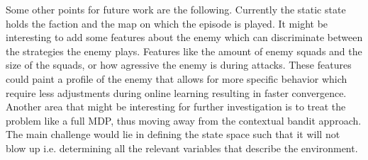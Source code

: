 Some other points for future work are the following. Currently the static state
holds the faction and the map on which the episode is played. It might be
interesting to add some features about the enemy which can discriminate between
the strategies the enemy plays. Features like the amount of enemy squads and
the size of the squads, or how agressive the enemy is during attacks. These
features could paint a profile of the enemy that allows for more specific
behavior which require less adjustments during online learning resulting in
faster convergence.\\
Another area that might be interesting for further investigation is to treat
the problem like a full MDP, thus moving away from the contextual bandit
approach. The main challenge would lie in defining the state space such that it
will not blow up i.e. determining all the relevant variables that describe the
environment.




